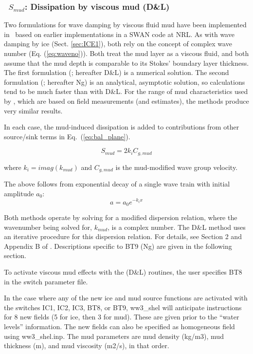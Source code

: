 \vsssub
\subsubsection{~$S_{mud}$: Dissipation by viscous mud (D\&L)} \label{sec:BT8}
\vsssub


\noindent
Two formulations for wave damping by viscous fluid mud have been implemented
in \ws\, based on earlier implementations in a SWAN code at NRL.  As with wave
damping by ice (Sect. \ref{sec:ICE1}), both rely on the concept of complex
wave number (Eq. (\ref{eq:waveno})). Both treat the mud layer as a viscous
fluid, and both assume that the mud depth is comparable to its Stokes'
boundary layer thickness. The first formulation (\cite{art:DL78}; hereafter
D\&L) is a numerical solution.  The second formulation (\cite{art:Ng00};
hereafter Ng) is an analytical, asymptotic solution, so calculations tend to
be much faster than with D\&L. For the range of mud characteristics used by
\cite{art:RH09}, which are based on field measurements (and estimates),
the methods produce very similar results.

In each case, the mud-induced dissipation is added to contributions from other
source/sink terms in Eq.~(\ref{eq:bal_plane}).

\begin{equation}\label{eq:dmud1}
  {S_{mud}} = 2  k_i {C_{g,mud}}
\end{equation}

\noindent
where $k_i=imag({k_{mud}})$ and ${C_{g,mud}}$ is the mud-modified wave group
velocity.

The above follows from exponential decay of a single wave train with initial
amplitude $a_0$:
\begin{equation}\label{eq:dmud2}
 a=a_0e^{-k_ix}
\end{equation}

\noindent
Both methods operate by solving for a modified dispersion relation, where the
wavenumber being solved for, ${k_{mud}}$, is a complex number. The D\&L method
uses an iterative procedure for this dispersion relation. For details, see
Section 2 and Appendix B of \cite{art:DL78}. Descriptions specific to {\code
BT9} (Ng) are given in the following section.

To activate viscous mud effects with the (D\&L) routines, the user specifies
{\code BT8} in the switch parameter file.

In the case where any of the new ice and mud source functions are activated
with the switches {\code IC1}, {\code IC2}, {\code IC3}, {\code BT8}, or
{\code BT9}, {\file ww3\_shel} will anticipate instructions for 8 new fields
(5 for ice, then 3 for mud). These are given prior to the ``water levels''
information. The new fields can also be specified as homogeneous field using
{\file ww3\_shel.inp}. The mud parameters are mud density (kg/m3), mud
thickness (m), and mud viscosity (m2/s), in that order.

